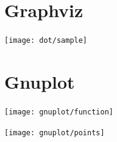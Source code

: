 \section{Graphviz}


{
\begin{center}
\texttt{[image: dot/sample]}
\end{center}
}


\section{Gnuplot}


{
\begin{center}
\texttt{[image: gnuplot/function]}
\end{center}
}


{
\begin{center}
\texttt{[image: gnuplot/points]}
\end{center}
}
